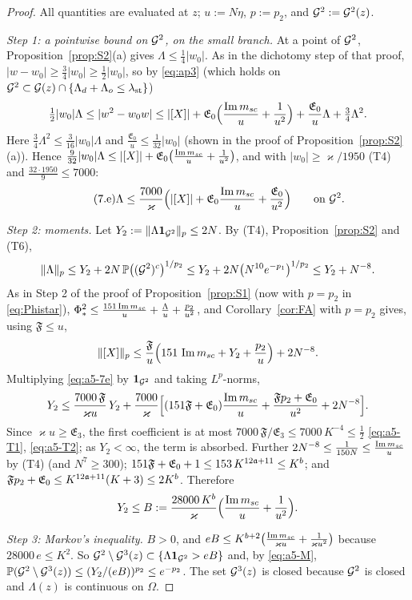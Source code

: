 \begin{proof}
All quantities are evaluated at $z$; $u:=N\eta$, $p:=p_2$, and $\mathcal{G}^2:=\mathcal{G}^2(z)$.

\emph{Step 1: a pointwise bound on $\mathcal{G}^2$, on the small branch.} At a point of $\mathcal{G}^2$, Proposition~\ref{prop:S2}(a) gives $\Lambda\le\frac14|w_0|$. As in the dichotomy step of that proof, $|w-w_0|\ge\frac34|w_0|\ge\frac12|w_0|$, so by \eqref{eq:ap3}
(which holds on $\mathcal{G}^2\subset\mathcal{G}(z)\cap\{\Lambda_d+\Lambda_o\le\lambda_{\rm st}\}$)
\[
 \tfrac12|w_0|\Lambda\le|w^2-w_0w|\le|[X]|+\mathfrak E_0\Big(\frac{\operatorname{Im}m_{sc}}{u}+\frac1{u^2}\Big)+\frac{\mathfrak E_0}{u}\Lambda+\tfrac34\Lambda^2 .
\]
Here $\frac34\Lambda^2\le\frac3{16}|w_0|\Lambda$ and $\frac{\mathfrak E_0}{u}\le\frac1{32}|w_0|$ (shown in the proof of Proposition~\ref{prop:S2}(a)). Hence $\frac9{32}|w_0|\Lambda\le|[X]|+\mathfrak E_0\big(\frac{\operatorname{Im}m_{sc}}{u}+\frac1{u^2}\big)$, and with $|w_0|\ge\varkappa/1950$ (T4) and $\frac{32\cdot1950}{9}\le7000$:
\begin{equation}\tag{7.e}\label{eq:a5-7e}
 \Lambda\le\frac{7000}{\varkappa}\Big(|[X]|+\mathfrak E_0\frac{\operatorname{Im}m_{sc}}{u}+\frac{\mathfrak E_0}{u^2}\Big)\qquad\text{on }\mathcal{G}^2 .
\end{equation}

\emph{Step 2: moments.} Let $Y_2:=\|\Lambda\mathbf{1}_{\mathcal{G}^2}\|_p\le2N$. By (T4), Proposition~\ref{prop:S2} and (T6),
\[
 \|\Lambda\|_p\le Y_2+2N\,\mathbb{P}\big((\mathcal{G}^2)^c\big)^{1/p_2}\le Y_2+2N\big(N^{10}e^{-p_1}\big)^{1/p_2}\le Y_2+N^{-8}.
\]
As in Step 2 of the proof of Proposition~\ref{prop:S1} (now with $p=p_2$ in \eqref{eq:Phistar}), $\Phi_*^2\le\frac{151\operatorname{Im}m_{sc}}{u}+\frac\Lambda u+\frac{p_2}{u^2}$, and Corollary~\ref{cor:FA} with $p=p_2$ gives, using $\mathfrak F\le u$,
\[
 \|[X]\|_p\le\frac{\mathfrak F}{u}\Big(151\,\operatorname{Im}m_{sc}+Y_2+\frac{p_2}{u}\Big)+2N^{-8}.
\]
Multiplying \eqref{eq:a5-7e} by $\mathbf{1}_{\mathcal{G}^2}$ and taking $L^p$-norms,
\[
 Y_2\le\frac{7000\,\mathfrak F}{\varkappa u}\,Y_2+\frac{7000}{\varkappa}\Big[(151\mathfrak F+\mathfrak E_0)\frac{\operatorname{Im}m_{sc}}{u}+\frac{\mathfrak Fp_2+\mathfrak E_0}{u^2}+2N^{-8}\Big].
\]
Since $\varkappa u\ge\mathfrak E_3$, the first coefficient is at most $7000\,\mathfrak F/\mathfrak E_3\le7000\,K^{-4}\le\frac12$ \eqref{eq:a5-T1}, \eqref{eq:a5-T2}; as $Y_2<\infty$, the term is absorbed.
Further $2N^{-8}\le\frac1{150N}\le\frac{\operatorname{Im}m_{sc}}{u}$ by (T4) (and $N^7\ge300$); $151\mathfrak F+\mathfrak E_0+1\le153\,K^{12\mathfrak{a}+11}\le K^b$; and $\mathfrak Fp_2+\mathfrak E_0\le K^{12\mathfrak{a}+11}(K+3)\le2K^b$. Therefore
\[
 Y_2\le B:=\frac{28000\,K^b}{\varkappa}\Big(\frac{\operatorname{Im}m_{sc}}{u}+\frac1{u^2}\Big).
\]

\emph{Step 3: Markov's inequality.} $B>0$, and $eB\le K^{b+2}\big(\frac{\operatorname{Im}m_{sc}}{\varkappa u}+\frac1{\varkappa u^2}\big)$ because $28000\,e\le K^2$. So $\mathcal{G}^2\setminus\mathcal{G}^3(z)\subset\{\Lambda\mathbf{1}_{\mathcal{G}^2}>eB\}$ and, by \eqref{eq:a5-M},
$\mathbb{P}(\mathcal{G}^2\setminus\mathcal{G}^3(z))\le(Y_2/(eB))^{p_2}\le e^{-p_2}$. The set $\mathcal{G}^3(z)$ is closed because $\mathcal{G}^2$ is closed and $\Lambda(z)$ is continuous on $\Omega$.
\end{proof}
